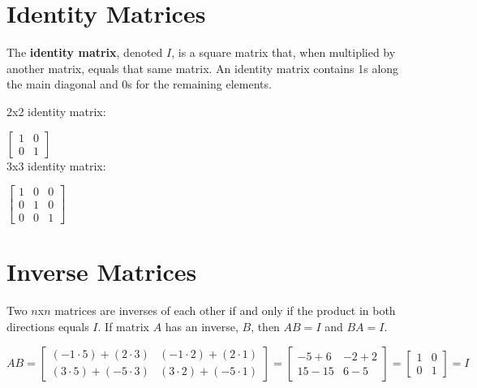 \documentclass{report}
\begin{document}
\section{Identity Matrices}

The \textbf{identity matrix}, denoted $I$, is a square matrix that, when multiplied by another matrix, equals that same matrix. An identity matrix contains 1s along the main diagonal and 0s for the remaining elements.

2x2 identity matrix:

$
    \begin{bmatrix}
        1 & 0 \\
        0 & 1
    \end{bmatrix}
$ \\

3x3 identity matrix:

$
    \begin{bmatrix}
        1 & 0 & 0 \\
        0 & 1 & 0 \\
        0 & 0 & 1
    \end{bmatrix}
$

\section{Inverse Matrices}

Two $n$x$n$ matrices are inverses of each other if and only if the product in both directions equals $I$. If matrix $A$ has an inverse, $B$, then $AB=I$ and $BA=I$.

$
    AB=
    \begin{bmatrix}
        (-1 \cdot 5)+(2 \cdot 3) & (-1 \cdot 2)+(2 \cdot 1) \\
        (3 \cdot 5)+(-5 \cdot 3) & (3 \cdot 2)+(-5 \cdot 1)
    \end{bmatrix}
    =
    \begin{bmatrix}
        -5+6 & -2+2 \\
        15-15 & 6-5
    \end{bmatrix}
    =
    \begin{bmatrix}
        1 & 0 \\
        0 & 1
    \end{bmatrix}
    =I
$ \\
\end{document}
